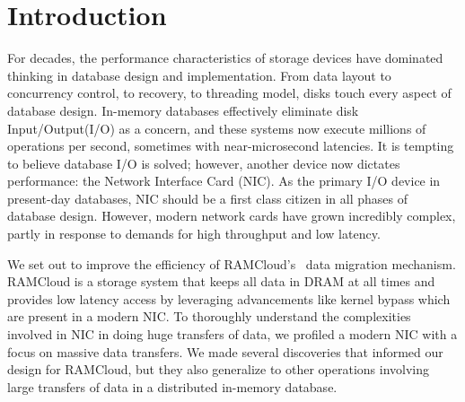 
\chapter{Introduction}
\label{chap:intro}
For decades, the performance characteristics of storage devices have dominated
 thinking in database design and implementation. From data layout to
concurrency control, to recovery, to threading model, disks touch every aspect
of database design. In-memory databases effectively eliminate disk Input/Output(I/O) as a
concern, and these systems now execute millions of operations per second,
sometimes with near-microsecond latencies.  It is tempting to believe 
database I/O is solved; however, another device now dictates
performance: the Network Interface Card (NIC). As the primary I/O device in present-day databases,
NIC should be a first class citizen in all phases of database design.
However, modern network cards have grown incredibly complex, partly in response
to demands for high throughput and low latency.

We set out to improve the efficiency of RAMCloud's~\cite{ramcloud} data migration mechanism. 
RAMCloud is a storage system that keeps all data in DRAM at all times and provides low latency access by
leveraging advancements like kernel bypass which are present in a modern NIC.
To thoroughly understand the complexities involved in NIC in doing huge
transfers of data, we profiled a modern NIC with a focus on massive data transfers.
 We made several discoveries that informed our design for RAMCloud,
 but they also generalize to other operations involving large transfers of data in a distributed in-memory database. 

